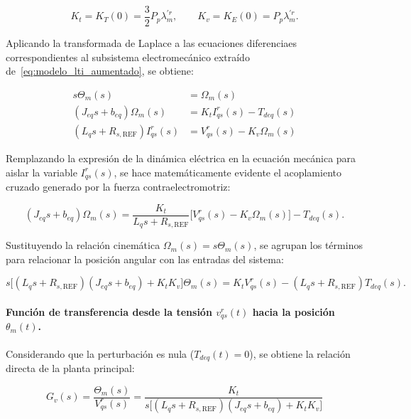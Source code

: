 \documentclass[10pt,a4paper]{article}
\begin{document}
\begin{equation*}
    K_t = K_T(0) = \frac{3}{2}P_p\lambda_m^{\prime r}, \qquad K_v = K_E(0) = P_p\lambda_m^{\prime r}.
\end{equation*}

Aplicando la transformada de Laplace a las ecuaciones diferenciaes correspondientes al subsistema electromecánico extraído de~\eqref{eq:modelo_lti_aumentado}, se obtiene:

\begin{align*}
    s \Theta_m(s) &= \Omega_m(s) \\
    (J_{eq}s + b_{eq}) \Omega_m(s) &= K_t I_{qs}^r(s) - T_{deq}(s) \\
    (L_q s + R_{s,\mathrm{REF}}) I_{qs}^r(s) &= V_{qs}^r(s) - K_v \Omega_m(s)
\end{align*}

Remplazando la expresión de la dinámica eléctrica en la ecuación mecánica para aislar la variable $I_{qs}^r(s)$, 
se hace matemáticamente evidente el acoplamiento cruzado generado por la fuerza contraelectromotriz:

\begin{equation*}
    (J_{eq}s + b_{eq}) \Omega_m(s) = \frac{K_t}{L_q s + R_{s,\mathrm{REF}}} \Big[ V_{qs}^r(s) - K_v \Omega_m(s) \Big] - T_{deq}(s).
\end{equation*}

Sustituyendo la relación cinemática $\Omega_m(s) = s \Theta_m(s)$, 
se agrupan los términos para relacionar la posición angular con las entradas del sistema:

\begin{equation}
    s \Big[ (L_q s + R_{s,\mathrm{REF}})(J_{eq}s + b_{eq}) + K_t K_v \Big] \Theta_m(s) = K_t V_{qs}^r(s) - (L_q s + R_{s,\mathrm{REF}}) T_{deq}(s).
\end{equation}

\paragraph{Función de transferencia desde la tensión $v_{qs}^r(t)$ hacia la posición $\theta_m(t)$.}
Considerando que la perturbación es nula ($T_{deq}(t) = 0$), se obtiene la relación directa de la planta principal:

\begin{equation}
    \boxed{
        G_v(s) = \frac{\Theta_m(s)}{V_{qs}^r(s)} = \frac{K_t}{s \Big[ (L_q s + R_{s,\mathrm{REF}})(J_{eq}s + b_{eq}) + K_t K_v \Big]}
    }
    \label{eq:ft_theta_vqs}
\end{equation}
\end{document}
